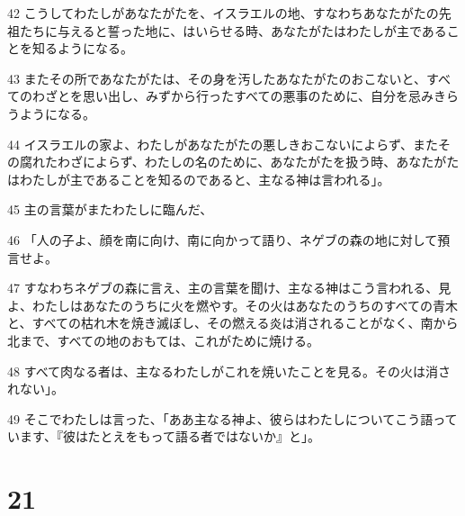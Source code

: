 \par 42 こうしてわたしがあなたがたを、イスラエルの地、すなわちあなたがたの先祖たちに与えると誓った地に、はいらせる時、あなたがたはわたしが主であることを知るようになる。
\par 43 またその所であなたがたは、その身を汚したあなたがたのおこないと、すべてのわざとを思い出し、みずから行ったすべての悪事のために、自分を忌みきらうようになる。
\par 44 イスラエルの家よ、わたしがあなたがたの悪しきおこないによらず、またその腐れたわざによらず、わたしの名のために、あなたがたを扱う時、あなたがたはわたしが主であることを知るのであると、主なる神は言われる」。
\par 45 主の言葉がまたわたしに臨んだ、
\par 46 「人の子よ、顔を南に向け、南に向かって語り、ネゲブの森の地に対して預言せよ。
\par 47 すなわちネゲブの森に言え、主の言葉を聞け、主なる神はこう言われる、見よ、わたしはあなたのうちに火を燃やす。その火はあなたのうちのすべての青木と、すべての枯れ木を焼き滅ぼし、その燃える炎は消されることがなく、南から北まで、すべての地のおもては、これがために焼ける。
\par 48 すべて肉なる者は、主なるわたしがこれを焼いたことを見る。その火は消されない」。
\par 49 そこでわたしは言った、「ああ主なる神よ、彼らはわたしについてこう語っています、『彼はたとえをもって語る者ではないか』と」。

\chapter{21}

